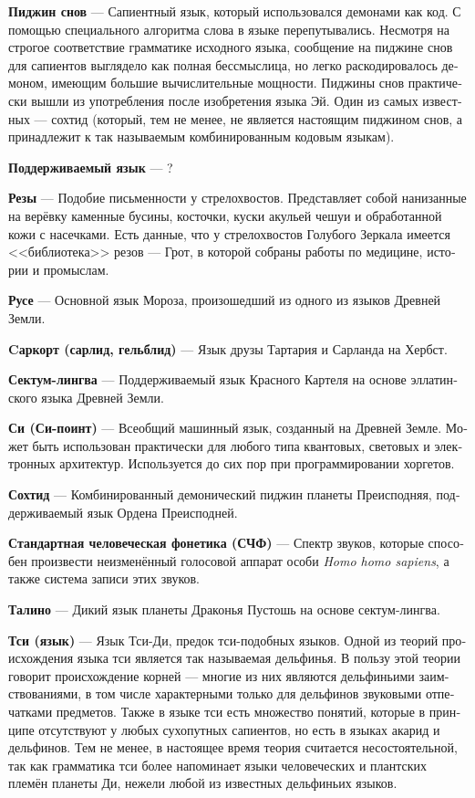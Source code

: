 \documentclass[a4paper,12pt,fleqn]{book}\usepackage{cooltooltips}\usepackage{polyglossia}\setdefaultlanguage[babelshorthands=true]{russian}\setotherlanguage{english}\defaultfontfeatures{Ligatures=TeX,Mapping=tex-text} \usepackage{xcolor}\definecolor{lightgray}{HTML}{bbbbbb}\color{lightgray}\newcommand{\ml}[3]{\textenglish{\textcolor{black}{#3}}}
\newcommand{\theterm}[3]{\textbf{\hypertarget{#1}{#2}} --- #3}
\begin{document}
\theterm{dream-pidgin}
{Пиджин снов}
{Сапиентный язык, который использовался демонами как код.
С помощью специального алгоритма слова в языке перепутывались.
Несмотря на строгое соответствие грамматике исходного языка, сообщение на пиджине снов для сапиентов выглядело как полная бессмыслица, но легко раскодировалось демоном, имеющим большие вычислительные мощности.
Пиджины снов практически вышли из употребления после изобретения языка Эй.
Один из самых известных --- сохтид (который, тем не менее, не является настоящим пиджином снов, а принадлежит к так называемым комбинированным кодовым языкам).}

\theterm{supported-language}
{Поддерживаемый язык}
{?}

\theterm{sketches}
{Резы}
{Подобие письменности у стрелохвостов.
Представляет собой нанизанные на верёвку каменные бусины, косточки, куски акульей чешуи и обработанной кожи с насечками.
Есть данные, что у стрелохвостов Голубого Зеркала имеется <<библиотека>> резов --- Грот, в которой собраны работы по медицине, истории и промыслам.}

\theterm{ruse}
{Русе}
{Основной язык Мороза, произошедший из одного из языков Древней Земли.}

\theterm{sarqort}
{Cаркорт (сарлид, гельблид)}
{Язык друзы Тартария и Сарланда на Хербст.}

\theterm{sectum-lingua}
{Сектум-лингва}
{Поддерживаемый язык Красного Картеля на основе эллатинского языка Древней Земли.}

\theterm{si}
{Си (Си-поинт)}
{Всеобщий машинный язык, созданный на Древней Земле.
Может быть использован практически для любого типа квантовых, световых и электронных архитектур.
Используется до сих пор при программировании хоргетов.}

\theterm{sojtid}
{Сохтид}
{Комбинированный демонический пиджин планеты Преисподняя, поддерживаемый язык Ордена Преисподней.}

\theterm{shp}
{Стандартная человеческая фонетика (СЧФ)}
{Спектр звуков, которые способен произвести неизменённый голосовой аппарат особи \textit{Homo homo sapiens}, а также система записи этих звуков.}

\theterm{talino}
{Талино}
{Дикий язык планеты Драконья Пустошь на основе сектум-лингва.}

\theterm{qi-language}
{Тси (язык)}
{Язык Тси-Ди, предок тси-подобных языков.
Одной из теорий происхождения языка тси является так называемая дельфинья.
В пользу этой теории говорит происхождение корней --- многие из них являются дельфиньими заимствованиями, в том числе характерными только для дельфинов звуковыми отпечатками предметов.
Также в языке тси есть множество понятий, которые в принципе отсутствуют у любых сухопутных сапиентов, но есть в языках акарид и дельфинов.
Тем не менее, в настоящее время теория считается несостоятельной, так как грамматика тси более напоминает языки человеческих и плантских племён планеты Ди, нежели любой из известных дельфиньих языков.}
\end{document}
